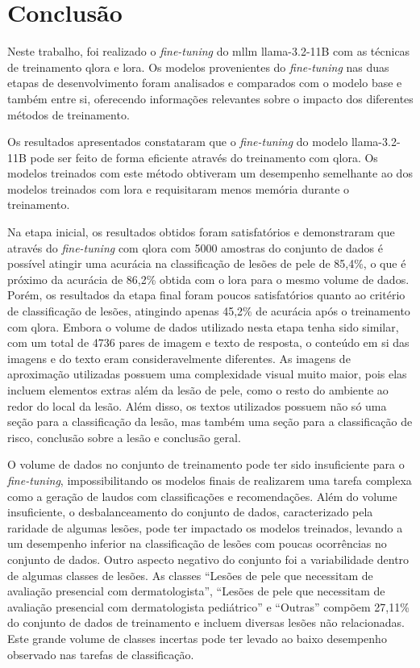 \section{Conclusão}

Neste trabalho, foi realizado o \textit{fine-tuning} do \ac{mllm} \ac{llama}-3.2-11B com as técnicas de treinamento
\ac{qlora} e \ac{lora}. Os modelos provenientes do \textit{fine-tuning} nas duas etapas de desenvolvimento foram
analisados e comparados com o modelo base e também entre si, oferecendo informações relevantes sobre o impacto dos
diferentes métodos de treinamento.

Os resultados apresentados constataram que o \textit{fine-tuning} do modelo \ac{llama}-3.2-11B pode ser feito de forma
eficiente através do treinamento com \ac{qlora}. Os modelos treinados com este método obtiveram um desempenho
semelhante ao dos modelos treinados com \ac{lora} e requisitaram menos memória durante o treinamento.

Na etapa inicial, os resultados obtidos foram satisfatórios e demonstraram que através do \textit{fine-tuning} com
\ac{qlora} com 5000 amostras do conjunto de dados é possível atingir uma acurácia na classificação
de lesões de pele de 85,4\%, o que é próximo da acurácia de 86,2\% obtida com o \ac{lora} para o mesmo volume de dados.
Porém, os resultados da etapa final foram poucos satisfatórios quanto ao critério de classificação de lesões, atingindo
apenas 45,2\% de acurácia após o treinamento com \ac{qlora}. Embora o volume de dados utilizado nesta etapa tenha sido
similar, com um total de 4736 pares de imagem e texto de resposta, o conteúdo em si das imagens e do texto eram
consideravelmente diferentes. As imagens de aproximação utilizadas possuem uma complexidade visual muito maior, pois
elas incluem elementos extras além da lesão de pele, como o resto do ambiente ao redor do local da lesão. Além disso,
os textos utilizados possuem não só uma seção para a classificação da lesão, mas também uma seção para a classificação
de risco, conclusão sobre a lesão e conclusão geral.

O volume de dados no conjunto de treinamento pode ter sido insuficiente para o \textit{fine-tuning}, impossibilitando
os modelos finais de realizarem uma tarefa complexa como a geração de laudos com classificações e recomendações. Além
do volume insuficiente, o desbalanceamento do conjunto de dados, caracterizado pela raridade de algumas lesões, pode
ter impactado os modelos treinados, levando a um desempenho inferior na classificação de lesões com poucas ocorrências
no conjunto de dados. Outro aspecto negativo do conjunto foi a variabilidade dentro de algumas classes de lesões. As
classes ``Lesões de pele que necessitam de avaliação presencial com dermatologista'', ``Lesões de pele que necessitam
de avaliação presencial com dermatologista pediátrico'' e ``Outras'' compõem 27,11\% do conjunto de dados de
treinamento e incluem diversas lesões não relacionadas. Este grande volume de classes incertas pode ter levado ao baixo
desempenho observado nas tarefas de classificação.

